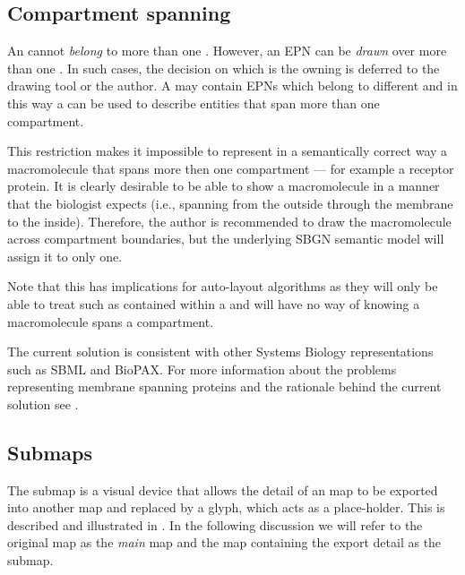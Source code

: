 \subsection{Compartment spanning}

An  cannot \emph{belong} to more than one
. However, an EPN can be \emph{drawn} over more than one
. In such cases, the decision on which is the owning
 is deferred to the drawing tool or the
author. A  may contain EPNs which belong to different
 and in this way a  can be used to describe
entities that span more than one {compartment}.

This restriction makes it impossible to represent in a semantically
correct way a macromolecule that spans more then one compartment ---
for example a receptor protein. It is clearly desirable to be able to
show a macromolecule in a manner that the biologist expects (i.e.,
spanning from the outside through the membrane to the
inside). Therefore, the author is recommended to draw the
macromolecule across compartment boundaries, but the underlying SBGN
semantic model will assign it to only one.

Note that this has implications for auto-layout algorithms as
they will only be able to treat such  as contained within
a  and will have no way of knowing a macromolecule spans a
compartment.

The current solution is consistent with other Systems Biology
representations such as SBML and BioPAX. For more information about the
problems representing membrane spanning proteins and the rationale
behind the current solution see .

\subsection{Submaps}

The submap is a visual device that allows the detail of an \PD map to be exported into another \PD map and replaced by a  glyph, which acts as a place-holder. This is described and illustrated in . In the following discussion we will refer to the original map as the \emph{main} map and the map containing the export detail as the submap. 

